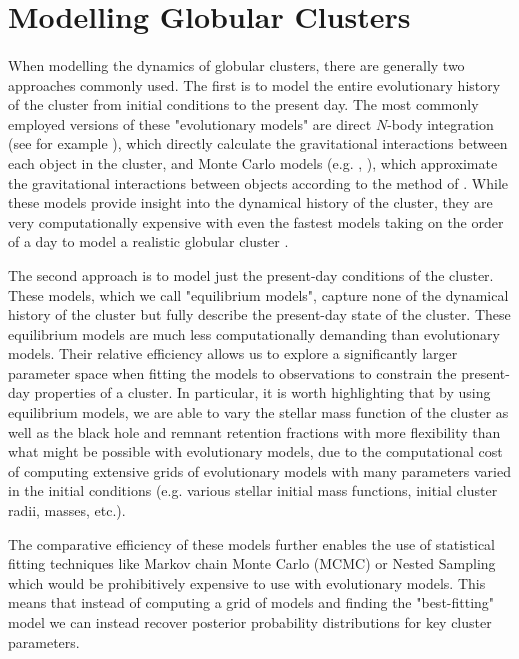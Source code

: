 \section{Modelling Globular Clusters}

\paragraph{}


When modelling the dynamics of globular clusters, there are generally two approaches commonly used.
The first is to model the entire evolutionary history of the cluster from initial conditions to the
present day. The most commonly employed versions of these "evolutionary models" are direct $N$-body
integration (see for example \citealt{Baumgardt2017a}), which directly calculate the gravitational
interactions between each object in the cluster, and Monte Carlo models (e.g.
\citealt{Rodriguez2021}, \citealt{Hypki2013}), which approximate the gravitational interactions
between objects according to the method of \citet{Henon1971}. While these models provide insight
into the dynamical history of the cluster, they are very computationally expensive with even the
fastest models taking on the order of a day to model a realistic globular cluster
\citep{Rodriguez2021}.

The second approach is to model just the present-day conditions of the cluster. These models, which
we call "equilibrium models", capture none of the dynamical history of the cluster but fully
describe the present-day state of the cluster. These equilibrium models are much less
computationally demanding than evolutionary models. Their relative efficiency allows us to explore a
significantly larger parameter space when fitting the models to observations to constrain the
present-day properties of a cluster. In particular, it is worth highlighting that by using
equilibrium models, we are able to vary the stellar mass function of the cluster as well as the
black hole and remnant retention fractions with more flexibility than what might be possible with
evolutionary models, due to the computational cost of computing extensive grids of evolutionary
models with many parameters varied in the initial conditions (e.g. various stellar initial mass
functions, initial cluster radii, masses, etc.).

The comparative efficiency of these models further enables the use of statistical fitting techniques
like Markov chain Monte Carlo (MCMC) or Nested Sampling which would be prohibitively expensive to use with evolutionary models.
This means that instead of computing a grid of models and finding the "best-fitting" model we can
instead recover posterior probability distributions for key cluster parameters.


